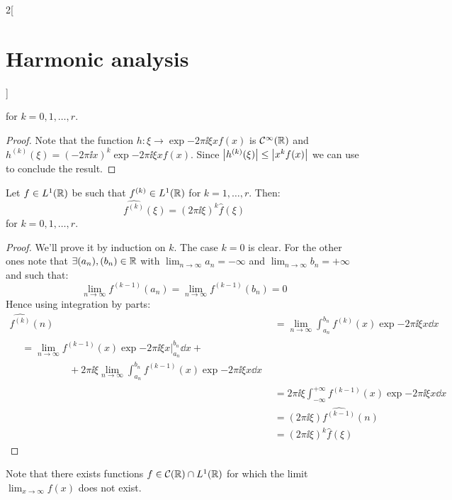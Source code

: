 \documentclass[../../../main_math.tex]{subfiles}
\begin{document}
\begin{multicols}{2}[\section{Harmonic analysis}]
\begin{proposition}
    for $k=0,1,\ldots, r$.
  \end{proposition}
  \begin{proof}
    Note that the function $h:\xi\rightarrow\exp{-2\pi\ii \xi x}f(x)$ is $\mathcal{C}^\infty(\mathbb{R})$ and $h^{(k)}(\xi)={(-2\pi\ii x)}^k\exp{-2\pi\ii \xi x}f(x)$. Since $\abs{h^{(k)}(\xi)}\leq \abs{x^kf(x)}$ we can use  to conclude the result.
  \end{proof}
  \begin{proposition}\label{HA:diffFourierTransf}
    Let $f\in L^1(\mathbb{R})$ be such that $f^{(k)}\in L^1(\mathbb{R})$ for $k=1,\ldots,r$. Then: $$\widehat{f^{(k)}}(\xi)={(2\pi\ii\xi)}^k\widehat{f}(\xi)$$ for $k=0,1,\ldots, r$.
  \end{proposition}
  \begin{proof}
    We'll prove it by induction on $k$. The case $k=0$ is clear.
    For the other ones note that $\exists(a_n),(b_n)\in\mathbb{R}$ with $\displaystyle\lim_{n\to\infty}a_n=-\infty$ and $\displaystyle\lim_{n\to\infty}b_n=+\infty$ and such that:
    $$\lim_{n\to\infty}f^{(k-1)}(a_n)=\lim_{n\to\infty}f^{(k-1)}(b_n)=0$$
    Hence using integration by parts:
    \begin{align*}
      \widehat{f^{(k)}}(n) & =\lim_{n\to\infty}\int_{a_n}^{b_n} f^{(k)}(x)\exp{-2\pi\ii \xi x}\dd{x}     \\
      \begin{split}
        & =\lim_{n\to\infty}  f^{(k-1)}(x)\exp{-2\pi\ii \xi x}\Big|_{a_n}^{b_n}\dd{x} +\\
        &\hspace{2cm}+2\pi\ii \xi\lim_{n\to\infty}\int_{a_n}^{b_n}f^{(k-1)}(x)\exp{-2\pi\ii \xi x}\dd{x}
      \end{split}    \\
                           & =2\pi\ii \xi\int_{-\infty}^{+\infty} f^{(k-1)}(x)\exp{-2\pi\ii \xi x}\dd{x} \\
                           & =\left(2\pi\ii \xi\right)\widehat{f^{(k-1)}}(n)                             \\
                           & ={\left(2\pi\ii \xi\right)}^k\widehat{f}(\xi)
    \end{align*}
  \end{proof}
  \begin{remark}
    Note that there exists functions $f\in\mathcal{C}(\mathbb{R})\cap L^1(\mathbb{R})$ for which the limit $\displaystyle\lim_{x\to\infty} f(x)$ does not exist.
  \end{remark}
  \begin{proposition}

\end{proposition}
\end{multicols}
\end{document}
